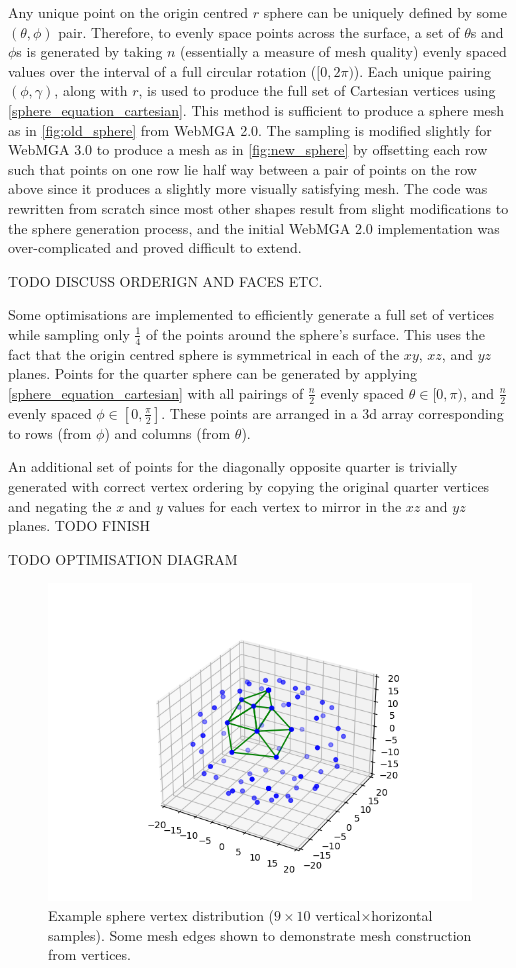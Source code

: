 Any unique point on the origin centred $r$ sphere can be uniquely defined by some $(\theta,\phi)$ pair. Therefore, to evenly space points across the surface, a set of $\theta$s and $\phi$s is generated by taking $n$ (essentially a measure of mesh quality) evenly spaced values over the interval of a full circular rotation ($[0, 2\pi)$). Each unique pairing $(\phi,\gamma)$, along with $r$, is used to produce the full set of Cartesian vertices using \cref{sphere_equation_cartesian}. This method is sufficient to produce a sphere mesh as in \cref{fig:old_sphere} from WebMGA 2.0. The sampling is modified slightly for WebMGA 3.0 to produce a mesh as in \cref{fig:new_sphere} by offsetting each row such that points on one row lie half way between a pair of points on the row above since it produces a slightly more visually satisfying mesh. The code was rewritten from scratch since most other shapes result from slight modifications to the sphere generation process, and the initial WebMGA 2.0 implementation was over-complicated and proved difficult to extend.

TODO DISCUSS ORDERIGN AND FACES ETC.

Some optimisations are implemented to efficiently generate a full set of vertices while sampling only $\frac{1}{4}$ of the points around the sphere's surface. This uses the fact that the origin centred sphere is symmetrical in each of the $xy$, $xz$, and $yz$ planes. Points for the quarter sphere can be generated by applying \cref{sphere_equation_cartesian} with all pairings of $\frac{n}{2}$ evenly spaced $\theta \in [0, \pi)$, and $\frac{n}{2}$ evenly spaced $\phi \in [0, \frac{\pi}{2}]$. These points are arranged in a 3d array corresponding to rows (from $\phi$) and columns (from $\theta$).

An additional set of points for the diagonally opposite quarter is trivially generated with correct vertex ordering by copying the original quarter vertices and negating the $x$ and $y$ values for each vertex to mirror in the $xz$ and $yz$ planes. TODO FINISH 

TODO OPTIMISATION DIAGRAM

\begin{figure}
  \begin{center}
    \includegraphics[width=0.5\linewidth]{assets/images/shapes/sphere_vertices}
    \caption{Example sphere vertex distribution ($9\times10$ vertical$\times$horizontal samples). Some mesh edges shown to demonstrate mesh construction from vertices.}
    \label{fig:sphere_vertices}
  \end{center}
\end{figure}

